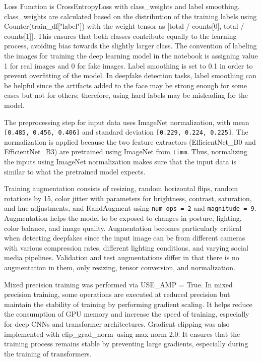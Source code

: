 \documentclass[12pt,a4paper]{report}
\begin{document}
Loss Function is CrossEntropyLoss with class\_weights and label smoothing. class\_weights are calculated based on the distribution of the training labels using Counter(train\_df["label"]) with the weight tensor as [total / counts[0], total / counts[1]]. This ensures that both classes contribute equally to the learning process, avoiding bias towards the slightly larger class. The convention of labeling the images for training the deep learning model in the notebook is assigning value 1 for real images and 0 for fake images. Label smoothing is set to 0.1 in order to prevent overfitting of the model. In deepfake detection tasks, label smoothing can be helpful since the artifacts added to the face may be strong enough for some cases but not for others; therefore, using hard labels may be misleading for the model.

The preprocessing step for input data uses ImageNet normalization, with mean \texttt{[0.485, 0.456, 0.406]} and standard deviation \texttt{[0.229, 0.224, 0.225]}. The normalization is applied because the two feature extractors (EfficientNet\_B0 and EfficientNet\_B3) are pretrained using ImageNet from \texttt{timm}. Thus, normalizing the inputs using ImageNet normalization makes sure that the input data is similar to what the pretrained model expects.

Training augmentation consists of resizing, random horizontal flips, random rotations by 15\degree, color jitter with parameters for brightness, contrast, saturation, and hue adjustments, and RandAugment using \texttt{num\_ops = 2} and \texttt{magnitude = 9}. Augmentation helps the model to be exposed to changes in posture, lighting, color balance, and image quality. Augmentation becomes particularly critical when detecting deepfakes since the input image can be from different cameras with various compression rates, different lighting conditions, and varying social media pipelines. Validation and test augmentations differ in that there is no augmentation in them, only resizing, tensor conversion, and normalization.

Mixed precision training was performed via USE\_AMP = True. In mixed precision training, some operations are executed at reduced precision but maintain the stability of training by performing gradient scaling. It helps reduce the consumption of GPU memory and increase the speed of training, especially for deep CNNs and transformer architectures. Gradient clipping was also implemented with clip\_grad\_norm\ using max norm 2.0. It ensures that the training process remains stable by preventing large gradients, especially during the training of transformers.
\end{document}
